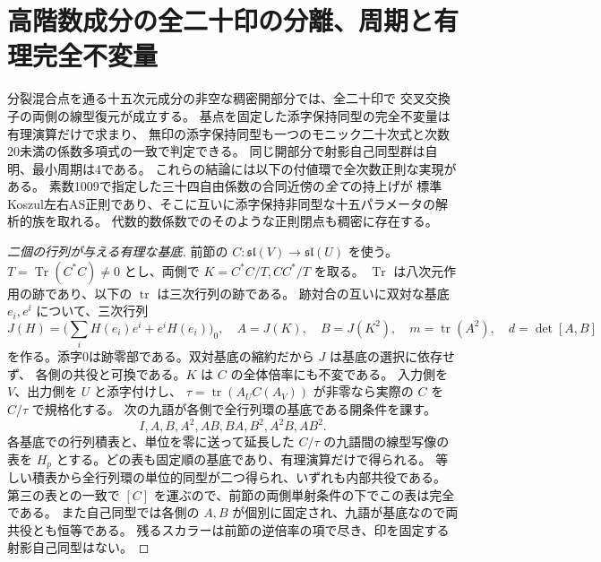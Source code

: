 \section{高階数成分の全二十印の分離、周期と有理完全不変量}
\label{sec:marked-twenty-rational-invariants}
\begin{theorem}\label{thm:marked-twenty-rational-invariants}
分裂混合点を通る十五次元成分の非空な稠密開部分では、全二十印で
交叉交換子の両側の線型復元が成立する。
基点を固定した添字保持同型の完全不変量は有理演算だけで求まり、
無印の添字保持同型も一つのモニック二十次式と次数20未満の係数多項式の一致で判定できる。
同じ開部分で射影自己同型群は自明、最小周期は4である。
これらの結論には以下の付値環で全次数正則な実現がある。
素数1009で指定した三十四自由係数の合同近傍の\emph{全て}の持上げが
標準Koszul左右AS正則であり、そこに互いに添字保持非同型な十五パラメータの解析的族を取れる。
代数的数係数でのそのような正則閉点も稠密に存在する。
\end{theorem}

\begin{proof}[二個の行列が与える有理な基底]
前節の $C:\mathfrak{sl}(V)\to\mathfrak{sl}(U)$ を使う。
$T=\operatorname{Tr}(C^*C)\ne0$ とし、両側で $K=C^*C/T,CC^*/T$ を取る。
$\operatorname{Tr}$ は八次元作用の跡であり、以下の $\operatorname{tr}$ は三次行列の跡である。
跡対合の互いに双対な基底 $e_i,e^i$ について、三次行列
\[
 J(H)=\Big(\sum_i H(e_i)e^i+e^i H(e_i)\Big)_0,\quad
 A=J(K),\quad B=J(K^2),\quad m=\operatorname{tr}(A^2),\quad d=\det[A,B]
\]
を作る。添字0は跡零部である。双対基底の縮約だから $J$ は基底の選択に依存せず、
各側の共役と可換である。$K$ は $C$ の全体倍率にも不変である。
入力側を $V$、出力側を $U$ と添字付けし、
$\tau=\operatorname{tr}(A_U C(A_V))$ が非零なら実際の $C$ を $C/\tau$ で規格化する。
次の九語が各側で全行列環の基底である開条件を課す。
\[
           I,A,B,A^2,AB,BA,B^2,A^2B,AB^2 .
\]
各基底での行列積表と、単位を零に送って延長した $C/\tau$ の九語間の線型写像の表を $H_p$
とする。どの表も固定順の基底であり、有理演算だけで得られる。
等しい積表から全行列環の単位的同型が二つ得られ、いずれも内部共役である。
第三の表との一致で $[C]$ を運ぶので、前節の両側単射条件の下でこの表は完全である。
また自己同型では各側の $A,B$ が個別に固定され、九語が基底なので両共役とも恒等である。
残るスカラーは前節の逆倍率の項で尽き、印を固定する射影自己同型はない。
\end{proof}

